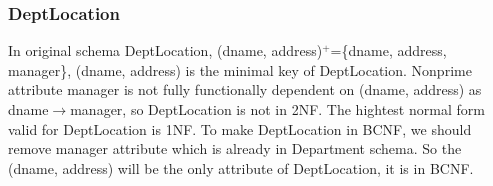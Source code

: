 \documentclass[12pt]{article}%
\begin{document}
\subsubsection*{DeptLocation}
\noindent In original schema DeptLocation, (dname, address)$^+$=\{dname, address, manager\}, (dname, address) is the minimal key of DeptLocation. Nonprime attribute manager is not fully functionally dependent on (dname, address) as dname$\rightarrow$manager, so DeptLocation is not in 2NF. The hightest normal form valid for DeptLocation is 1NF. To make DeptLocation in BCNF, we should remove manager attribute which is already in Department schema. So the (dname, address) will be the only attribute of DeptLocation, it is in BCNF. 



\clearpage
\end{document}
